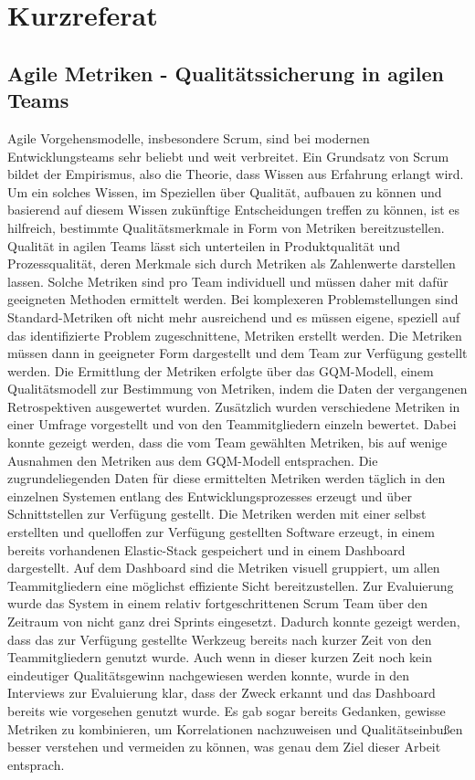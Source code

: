 \newpage
\chapter*{Kurzreferat}
\section*{Agile Metriken {-} Qualitätssicherung in agilen Teams}

Agile Vorgehensmodelle, insbesondere Scrum, sind bei modernen Entwicklungsteams sehr beliebt und weit verbreitet.
Ein Grundsatz von Scrum bildet der Empirismus, also die Theorie, dass Wissen aus Erfahrung erlangt wird.
Um ein solches Wissen, im Speziellen über Qualität, aufbauen zu können und basierend auf diesem Wissen zukünftige Entscheidungen treffen zu können, ist es hilfreich, bestimmte Qualitätsmerkmale in Form von Metriken bereitzustellen.
Qualität in agilen Teams lässt sich unterteilen in Produktqualität und Prozessqualität, deren Merkmale sich durch Metriken als Zahlenwerte darstellen lassen.
Solche Metriken sind pro Team individuell und müssen daher mit dafür geeigneten Methoden ermittelt werden.
Bei komplexeren Problemstellungen sind Standard-Metriken oft nicht mehr ausreichend und es müssen eigene, speziell auf das identifizierte Problem zugeschnittene, Metriken erstellt werden.
Die Metriken müssen dann in geeigneter Form dargestellt und dem Team zur Verfügung gestellt werden.
Die Ermittlung der Metriken erfolgte über das \ac{GQM}-Modell, einem Qualitätsmodell zur Bestimmung von Metriken, indem die Daten der vergangenen Retrospektiven ausgewertet wurden.
Zusätzlich wurden verschiedene Metriken in einer Umfrage vorgestellt und von den Teammitgliedern einzeln bewertet.
Dabei konnte gezeigt werden, dass die vom Team gewählten Metriken, bis auf wenige Ausnahmen den Metriken aus dem \ac{GQM}-Modell entsprachen.
Die zugrundeliegenden Daten für diese ermittelten Metriken werden täglich in den einzelnen Systemen entlang des Entwicklungsprozesses erzeugt und über Schnittstellen zur Verfügung gestellt.
Die Metriken werden mit einer selbst erstellten und quelloffen zur Verfügung gestellten Software erzeugt, in einem bereits vorhandenen Elastic-Stack gespeichert und in einem Dashboard dargestellt.
Auf dem Dashboard sind die Metriken visuell gruppiert, um allen Teammitgliedern eine möglichst effiziente Sicht bereitzustellen.
Zur Evaluierung wurde das System in einem relativ fortgeschrittenen Scrum Team über den Zeitraum von nicht ganz drei Sprints eingesetzt.
Dadurch konnte gezeigt werden, dass das zur Verfügung gestellte Werkzeug bereits nach kurzer Zeit von den Teammitgliedern genutzt wurde.
Auch wenn in dieser kurzen Zeit noch kein eindeutiger Qualitätsgewinn nachgewiesen werden konnte, wurde in den Interviews zur Evaluierung klar, dass der Zweck erkannt und das Dashboard bereits wie vorgesehen genutzt wurde.
Es gab sogar bereits Gedanken, gewisse Metriken zu kombinieren, um Korrelationen nachzuweisen und Qualitätseinbußen besser verstehen und vermeiden zu können, was genau dem Ziel dieser Arbeit entsprach.

